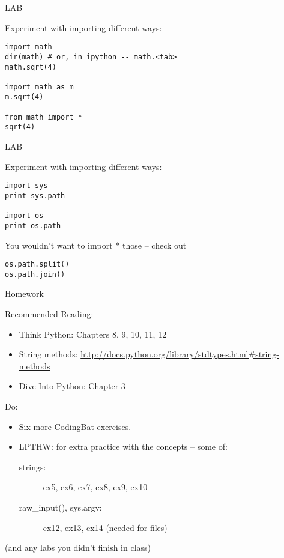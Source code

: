 \documentclass{beamer}
\begin{document}
\begin{frame}[fragile]{LAB}

{\Large  Experiment with importing different ways:}
\begin{verbatim}
import math
dir(math) # or, in ipython -- math.<tab>
math.sqrt(4)

import math as m
m.sqrt(4)

from math import *
sqrt(4)
\end{verbatim}

\end{frame}

\begin{frame}[fragile]{LAB}

{\Large  Experiment with importing different ways:}
\begin{verbatim}
import sys
print sys.path

import os
print os.path
\end{verbatim}
{\Large You wouldn't want to import * those -- check out}
\begin{verbatim}
os.path.split()
os.path.join()
\end{verbatim}

\end{frame}



\begin{frame}[fragile]{Homework}

Recommended Reading:
\begin{itemize}
  \item Think Python: Chapters 8, 9, 10, 11, 12
  \item String methods: \url{http://docs.python.org/library/stdtypes.html#string-methods}
  \item Dive Into Python: Chapter 3
\end{itemize}

Do:
\begin{itemize}
    \item Six more CodingBat exercises. 
    \item LPTHW: for extra practice with the concepts -- some of:
    \begin{description}
        \item[strings:] ex5, ex6, ex7, ex8, ex9, ex10
        \item[raw\_input(), sys.argv:] ex12, ex13, ex14 (needed for files)
    \end{description}    
\end{itemize}

\vfill
(and any labs you didn't finish in class)

\end{frame}
\end{document}
